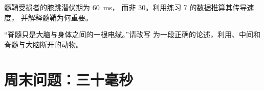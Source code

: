 \begin{exercise}[$\star\star\star$]\label{exo:g12:stretch-reflex:14}
髓鞘受损者的膝跳潜伏期为 \qty{60}{ms}，
而非 30。利用练习 7 的数据推算其传导速度，
并解释髓鞘为何重要。
\end{exercise}

\begin{exercise}[$\star\star\star$]\label{exo:g12:stretch-reflex:15}
“脊髓只是大脑与身体之间的一根电缆。”请改写
为一段正确的论述，利用、中间和
脊髓与大脑断开的动物。
\end{exercise}

\section{周末问题：三十毫秒}

